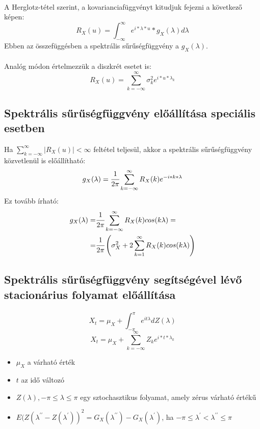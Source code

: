 \documentclass[11pt,a4pape,draftr]{article}
\begin{document}
			\paragraph{}
				A Herglotz-tétel szerint, a kovarianciafüggvényt kitudjuk fejezni a következő képen:
				$$R_X (u)=\int_{-\infty}^\infty e^{i*\lambda*u}*g_X(\lambda)d\lambda$$
				Ebben az összefüggésben a spektrális sűrűségfüggvény a $g_X(\lambda)$.
			\paragraph{}
				Analóg módon értelmezzük a diszkrét esetet is:
				$$R_X(u) = \sum_{k = - \infty}^\infty \sigma^2_k e^{i*u* \lambda_k}$$
			\subsection{Spektrális sűrűségfüggvény előállítása speciális esetben}
				Ha $\sum_{k=- \infty}^{\infty}|R_X(u)| < \infty$ feltétel teljesül, akkor a spektrális sűrűségfüggvény közvetlenül is előállítható:
				$$g_X(\lambda) = \cfrac{1}{2 \pi} \sum_{k = - \infty} ^{\infty} R_X(k) e^{-i * k *\lambda}$$
				Ez tovább írható:
				$$
				\begin{aligned}
					g_X(\lambda) =& \cfrac{1}{ 2  \pi} \sum_{k = - \infty}^{\infty}R_X(k)cos(k \lambda) = \\
					=& \cfrac{1}{2 \pi} \left( \sigma_X^2 + 2 \sum_{k = 1}^{\infty} R_X(k) cos(k \lambda) \right)
				\end{aligned}$$
			\subsection{Spektrális sűrűségfüggvény segítségével lévő stacionárius folyamat előállítása}
				\paragraph{}
					$$X_t = \mu_X + \int_{- \pi} ^\pi e^{it\lambda} d Z(\lambda)$$
					$$X_t = \mu_X + \sum_{k=-\infty}^{\infty}Z_ke^{i*t*\lambda_k}$$
					\begin{itemize}
						\item $\mu_X$ a várható érték
						\item $t$ az idő változó
						\item $Z(\lambda), -\pi \le \lambda \le \pi$ egy sztochasztikus folyamat, amely zérus várható értékű
						\item $E(Z(\lambda^{\prime\prime} - Z(\lambda^{\prime}))^2 = G_X(\lambda^{\prime \prime}) -G_X(\lambda^{\prime})$, ha $-\pi \le \lambda^{\prime} < \lambda^{\prime \prime} \le \pi$ 
					\end{itemize}
\end{document}
